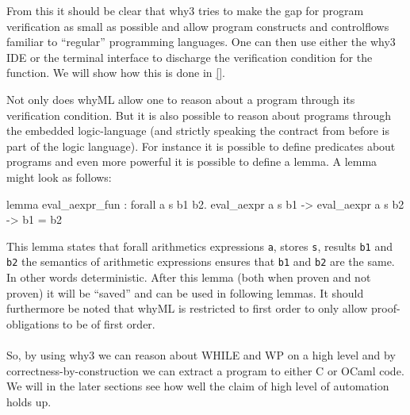 From this it should be clear that why3 tries to make the gap for program verification as small as possible and allow program constructs and controlflows familiar to ``regular'' programming languages.
One can then use either the why3 IDE or the terminal interface to discharge the verification condition for the function. We will show how this is done in \autoref{}.

Not only does whyML allow one to reason about a program through its verification condition. But it is also possible to reason about programs through the embedded logic-language
(and strictly speaking the contract from before is part of the logic language).
For instance it is possible to define predicates about programs and even more powerful it is possible to define a lemma.
A lemma might look as follows:

\begin{lstlistings}[caption={Lemma stating determinism of arithmetic expressions},label={lst:why3fun},language=sml]
  lemma eval_aexpr_fun : forall a s b1 b2.
     eval_aexpr a s b1 -> eval_aexpr a s b2 -> b1 = b2
   \end{lstlistings}

This lemma states that forall arithmetics expressions \texttt{a}, stores \texttt{s}, results \texttt{b1} and \texttt{b2} the semantics of arithmetic expressions ensures that \texttt{b1} and \texttt{b2} are the same.
In other words deterministic. After this lemma (both when proven and not proven) it will be ``saved'' and can be used in following lemmas.
It should furthermore be noted that whyML is restricted to first order to only allow proof-obligations to be of first order.
\\~\\
So, by using why3 we can reason about WHILE and WP on a high level and by correctness-by-construction we can extract a program to either C or OCaml code\cite{}. We will in the later sections see how well the claim of high level of automation holds up.